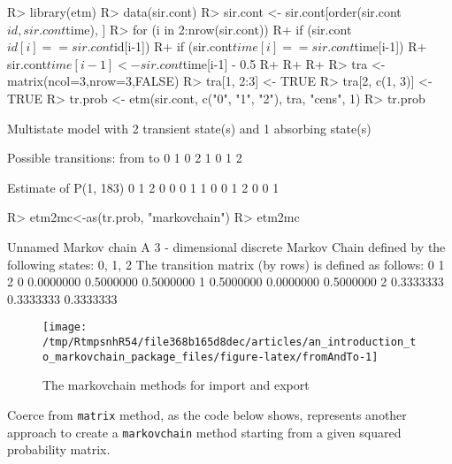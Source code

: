\documentclass[
  nojss]{jss}
\begin{document}
\begin{CodeChunk}

\begin{CodeInput}
R> library(etm)
R> data(sir.cont)
R> sir.cont <- sir.cont[order(sir.cont$id, sir.cont$time), ]
R> for (i in 2:nrow(sir.cont)) {
R+   if (sir.cont$id[i]==sir.cont$id[i-1]) {
R+     if (sir.cont$time[i]==sir.cont$time[i-1]) {
R+       sir.cont$time[i-1] <- sir.cont$time[i-1] - 0.5
R+     }
R+   }
R+ }
R> tra <- matrix(ncol=3,nrow=3,FALSE)
R> tra[1, 2:3] <- TRUE
R> tra[2, c(1, 3)] <- TRUE
R> tr.prob <- etm(sir.cont, c("0", "1", "2"), tra, "cens", 1)
R> tr.prob
\end{CodeInput}

\begin{CodeOutput}
Multistate model with 2 transient state(s)
 and 1 absorbing state(s)

Possible transitions:
 from to
    0  1
    0  2
    1  0
    1  2

Estimate of P(1, 183)
  0 1 2
0 0 0 1
1 0 0 1
2 0 0 1
\end{CodeOutput}

\begin{CodeInput}
R> etm2mc<-as(tr.prob, "markovchain")
R> etm2mc
\end{CodeInput}

\begin{CodeOutput}
Unnamed Markov chain 
 A  3 - dimensional discrete Markov Chain defined by the following states: 
 0, 1, 2 
 The transition matrix  (by rows)  is defined as follows: 
          0         1         2
0 0.0000000 0.5000000 0.5000000
1 0.5000000 0.0000000 0.5000000
2 0.3333333 0.3333333 0.3333333
\end{CodeOutput}
\end{CodeChunk}

\begin{CodeChunk}
\begin{figure}

{\centering \texttt{[image: /tmp/RtmpsnhR54/file368b165d8dec/articles/an\_introduction\_to\_markovchain\_package\_files/figure-latex/fromAndTo-1]} 

}

\caption[The markovchain methods for import and export]{The markovchain methods for import and export}\label{fig:fromAndTo}
\end{figure}
\end{CodeChunk}

Coerce from \texttt{matrix} method, as the code below shows, represents another approach to create a \texttt{markovchain} method starting from a given squared probability matrix.
\end{document}

